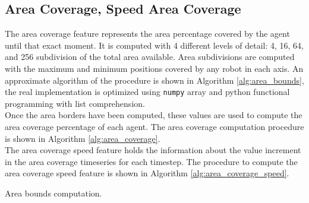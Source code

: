 \documentclass[../../Thesis.tex]{subfiles}
\begin{document}
		\subsection{Area Coverage, Speed Area Coverage}
		\label{sec:Fault_detection:area_coverage_speed_area_coverage}%
			The area coverage feature represents the area percentage covered by the agent until that exact moment.  It is computed with 4 different levels of detail: 4, 16, 64, and 256 subdivision of the total area available. Area subdivisions are computed with the maximum and minimum positions covered by any robot in each axis. An approximate algorithm of the procedure is shown in Algorithm \ref{alg:area_bounds}, the real implementation is optimized using \verb|numpy| array and python functional programming with list comprehension.\\
			Once the area borders have been computed, these values are used to compute the area coverage percentage of each agent. The area coverage computation procedure is shown in Algorithm \ref{alg:area_coverage}.\\
			The area coverage speed feature holds the information about the value increment in the area coverage timeseries for each timestep. The procedure to compute the area coverage speed feature is shown in Algorithm \ref{alg:area_coverage_speed}.
			\begin{algorithm}
	 		 	\caption{Area bounds computation.}
	 		 	\label{alg:area_bounds}
			    	\begin{algorithmic}[1]
				    			\ENDIF
				    			\ENDIF
				    			\ENDIF
				    			\ENDIF
				    		\ENDFOR
				    	\ENDFOR
				    		\ENDFOR
				    	\ENDFOR
			    	\end{algorithmic}
			\end{algorithm}
			
\end{document}
